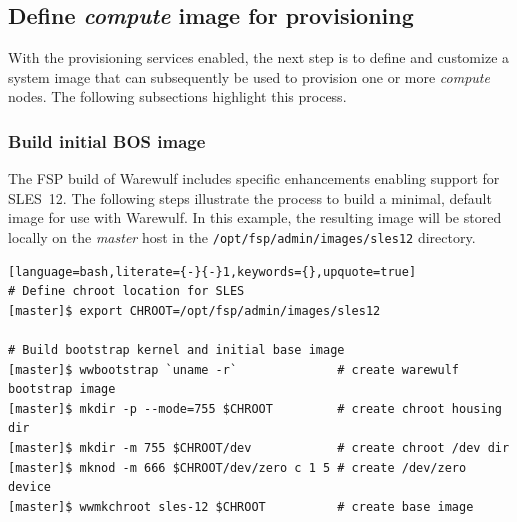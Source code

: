\documentclass[letterpaper]{article}
\begin{document}

\subsection{Define {\em compute} image for provisioning}

With the provisioning services enabled, the next step is to define and
customize a system image that can subsequently be used to provision one or more
{\em compute} nodes. The following subsections highlight this process.

\subsubsection{Build initial BOS image}

The FSP build of Warewulf includes specific enhancements enabling support for
SLES~12. The following steps illustrate the process to build a minimal, default
image for use with Warewulf. In this example, the resulting image will be
stored locally on the {\em master} host in the
\texttt{/opt/fsp/admin/images/sles12} directory.

\begin{lstlisting}[language=bash,literate={-}{-}1,keywords={},upquote=true]
# Define chroot location for SLES 
[master]$ export CHROOT=/opt/fsp/admin/images/sles12

# Build bootstrap kernel and initial base image
[master]$ wwbootstrap `uname -r`              # create warewulf bootstrap image
[master]$ mkdir -p --mode=755 $CHROOT         # create chroot housing dir
[master]$ mkdir -m 755 $CHROOT/dev            # create chroot /dev dir
[master]$ mknod -m 666 $CHROOT/dev/zero c 1 5 # create /dev/zero device
[master]$ wwmkchroot sles-12 $CHROOT          # create base image

\end{lstlisting}
\end{document}
